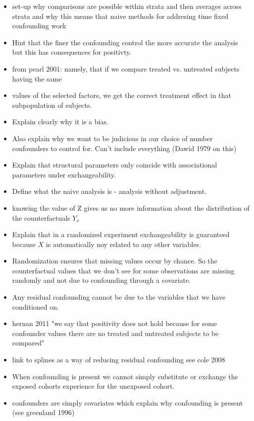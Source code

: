 \documentclass[11pt]{article}
\providecommand{\tightlist}{%
      \setlength{\itemsep}{0pt}\setlength{\parskip}{0pt}}
\begin{document}
\begin{itemize}
\tightlist
\item
  set-up why comparisons are possible within strata and then averages
  across strata and why this means that naive methods for addresing time
  fixed confounding work
\item
  Hint that the finer the confounding control the more accurate the
  analysis but this has consequences for positivty.
\item
  from pearl 2001: namely, that if we compare treated vs. untreated
  subjects having the same
\item
  values of the selected factors, we get the correct treatment effect in
  that subpopulation of subjects.
\item
  Explain clearly why it is a bias.
\item
  Also explain why we want to be judicious in our choice of number
  confounders to control for. Can't include everything (Dawid 1979 on
  this)
\item
  Explain that structural parameters only coincide with associational
  parameters under exchangeability.
\item
  Define what the naive analysis is - analysis without adjustment.
\item
  knowing the value of Z gives us no more information about the
  distribution of the counterfactuals \(Y_x\)
\item
  Explain that in a randomized experiment exchangeability is guaranteed
  because \(X\) is automatically noy related to any other variables.
\item
  Randomization ensures that missing values occur by chance. So the
  counterfactual values that we don't see for some observations are
  missing randomly and not due to confounding through a covariate.
\item
  Any residual confounding cannot be due to the variables that we have
  conditioned on.
\item
  hernan 2011 "we say that positivity does not hold because for some
  confounder values there are no treated and untreated subjects to be
  compared"
\item
  link to splines as a way of reducing residual confounding see cole
  2008
\item
  When confounding is present we cannot simply substitute or exchange
  the exposed cohorts experience for the unexposed cohort.
\item
  confounders are simply covariates which explain why confounding is
  present (see greenland 1996)
\end{itemize}
\end{document}
